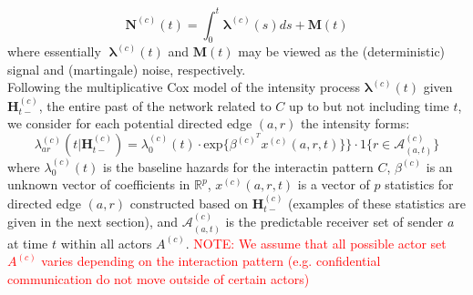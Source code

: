 \documentclass[a4paper]{article}
\begin{document}
\begin{equation}
\mathbf{N}^{(c)}(t)=\int_0^t\boldsymbol{\lambda}^{(c)}(s)ds + \mathbf{M}(t)
\end{equation}
where essentially $\boldsymbol{\lambda}^{(c)}(t)$ and $\mathbf{M}(t)$ may be viewed as the (deterministic) signal and (martingale) noise, respectively.\\ \newline
Following the multiplicative Cox model of the intensity process $\boldsymbol{\lambda}^{(c)}(t)$ given $\boldsymbol{H}^{(c)}_{t-}$, the entire past of the network related to $C$ up to but not including time $t$, we consider for each potential directed edge $(a, r)$ the intensity forms:
\begin{equation}
 \lambda^{(c)}_{ar}(t|\boldsymbol{H}^{(c)}_{t-})=\lambda_0^{(c)}(t)\cdot \mbox{exp}\{\beta^{(c)}^Tx^{(c)}(a, r, t)\}\}\cdot 1\{r \in \mathcal{A}^{(c)}_{(a, t)}\}
\end{equation}
where $\lambda_0^{(c)}(t)$ is the baseline
hazards for the interactin pattern $C$, $\beta^{(c)}$ is an unknown vector of coefficients in $\mathbb{R}^{p}$, $x^{(c)}(a, r, t)$ is a vector of $p$ statistics for directed edge $(a, r)$ constructed based on
$\boldsymbol{H}^{(c)}_{t-}$ (examples of these statistics are given in the next section), and $\mathcal{A}^{(c)}_{(a, t)}$ is the predictable receiver set of sender $a$ at time $t$ within all actors $A^{(c)}$. \textcolor{red}{NOTE: We assume that all possible actor set $A^{(c)}$ varies depending on the interaction pattern (e.g. confidential communication do not move outside of certain actors) }
\end{document}
